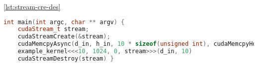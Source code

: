 

\autoref{lst:stream-cre-des}

\begin{lstlisting}[language=C++,caption={Stream creation, usage and destruction},label=lst:stream-cre-des]
int main(int argc, char ** argv) {
	cudaStream_t stream;
	cudaStreamCreate(&stream);
	cudaMemcpyAsync(d_in, h_in, 10 * sizeof(unsigned int), cudaMemcpyHostToDevice, stream);
	example_kernel<<<10, 1024, 0, stream>>>(d_in, 10)
	cudaStreamDestroy(stream) }
\end{lstlisting}